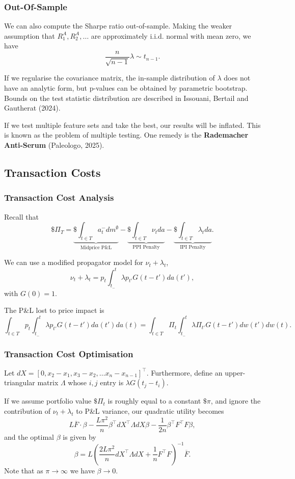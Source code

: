 \documentclass{article}
\begin{document}
\subsubsection{Out-Of-Sample}
We can also compute the Sharpe ratio out-of-sample. Making the weaker assumption that $R_1^A,R_2^A,\ldots$ are approximately i.i.d. normal with mean zero, we have
$$\frac{n}{\sqrt{n-1}}\lambda \sim t_{n-1}.$$

If we regularise the covariance matrix, the in-sample distribution of $\lambda$ does not have an analytic form, but p-values can be obtained by parametric bootstrap. Bounds on the test statistic distribution are described in Issouani, Bertail and Gautherat (2024).

If we test multiple feature sets and take the best, our results will be inflated. This is known as the problem of multiple testing. One remedy is the \textbf{Rademacher Anti-Serum} (Paleologo, 2025).

\subsection{Transaction Costs}
\subsubsection{Transaction Cost Analysis}
Recall that
$$\$\Pi_T	= \underbrace{\$\int_{t\in T} a_t^- dm^\emptyset}_{\textrm{Midprice P\&L}} - \underbrace{\$\int_{t\in T} \nu_t da}_{\textrm{PPI Penalty}} - \underbrace{\$\int_{t\in T} \lambda_t da}_{\textrm{IPI Penalty}}.$$

We can use a modified propagator model for $\nu_t+\lambda_t$,
$$\nu_t+\lambda_t = p_t\int_{t_-}^t \lambda p_{t'} G(t-t')da(t'),$$
with $G(0)=1$.

The P\&L lost to price impact is
$$\int_{t\in T} p_t \int_{t_-}^t \lambda p_{t'} G(t-t')da(t') da(t) = \int_{t\in T} \Pi_t \int_{t_-}^t \lambda \Pi_{t'} G(t-t') dw(t') dw(t).$$

\subsubsection{Transaction Cost Optimisation}
Let $dX = [0,x_2-x_1,x_3-x_2,\ldots x_n-x_{n-1}]^\top$. Furthermore, define an upper-triangular matrix $\Lambda$ whose $i,j$ entry is $\lambda G(t_j-t_i)$.

If we assume portfolio value $\$\Pi_t$ is roughly equal to a constant $\$\pi$, and ignore the contribution of $\nu_t+\lambda_t$ to P\&L variance, our quadratic utility becomes
$$L\overline{F} \cdot \beta - \frac{L\pi^2}{n}\beta^\top dX^\top \Lambda dX\beta - \frac{1}{2n}\beta^\top F^\top F\beta,$$
and the optimal $\beta$ is given by
$$\beta = L\left(\frac{2L\pi^2}{n} dX^\top \Lambda dX + \frac{1}{n}F^\top F\right)^{-1}\overline{F}.$$
Note that as $\pi\to\infty$ we have $\beta\to 0$.
\end{document}
